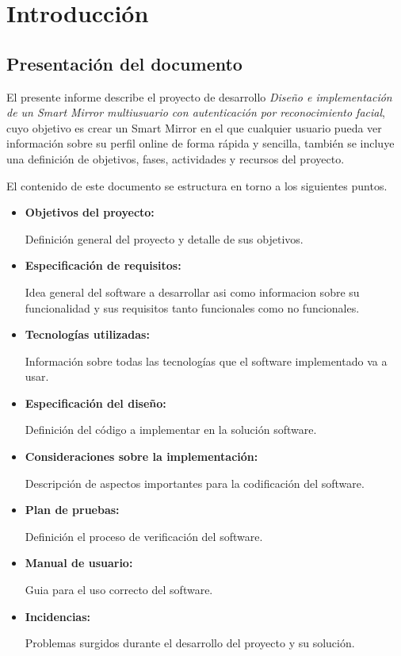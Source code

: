 \chapter{Introducción}\label{cha:introduccion}

\section{Presentación del documento}

El presente informe describe el proyecto de desarrollo \emph{Diseño e implementación de un Smart Mirror multiusuario con autenticación por reconocimiento facial}, cuyo objetivo es crear un Smart Mirror en el que cualquier usuario pueda ver información sobre su perfil online de forma rápida y sencilla, también se incluye una definición de objetivos, fases, actividades y recursos del proyecto.

El contenido de este documento se estructura en torno a los siguientes puntos.

\begin{itemize}
	\item \textbf{Objetivos del proyecto:}

	Definición general del proyecto y detalle de sus objetivos.

	\item \textbf{Especificación de requisitos:}
		
	Idea general del software a desarrollar asi como informacion sobre su funcionalidad y sus requisitos tanto funcionales como no funcionales.
	
	\item \textbf{Tecnologías utilizadas:}
		
	Información sobre todas las tecnologías que el software implementado va a usar.
	
	\item \textbf{Especificación del diseño:}

	Definición del código a implementar en la solución software.

	\item \textbf{Consideraciones sobre la implementación:}
	
	Descripción de aspectos importantes para la codificación del software.

	\item \textbf{Plan de pruebas:}

	Definición el proceso de verificación del software.

	\item \textbf{Manual de usuario:}
	
	Guia para el uso correcto del software.

	\item \textbf{Incidencias:}
	
	Problemas surgidos durante el desarrollo del proyecto y su solución.

\end{itemize}

